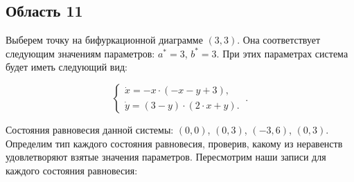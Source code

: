 \subsection{Область 11}

Выберем точку на бифуркационной диаграмме $(3, 3)$. Она соответствует следующим значениям параметров:  $a^\ast = 3$, $b^\ast = 3$. При этих параметрах система будет иметь следующий вид: 

$$
\left \lbrace 
\begin{matrix} 
	\dot{x} = -x \cdot (-x - y + 3), \\
	\dot{y} = (3 - y) \cdot (2 \cdot x + y). \
\end{matrix} 
\right . .$$

Состояния равновесия данной системы: $(0, 0)$, $(0, 3)$, $(-3, 6)$, $(0, 3)$. Определим тип каждого состояния равновесия, проверив, какому из неравенств удовлетворяют взятые значения параметров.  Пересмотрим наши записи для каждого состояния равновесия: 

